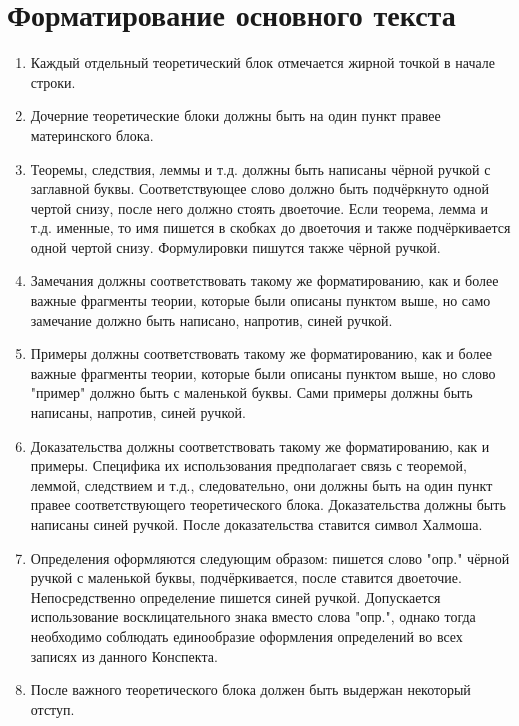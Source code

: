 \documentclass[a4paper]{article}
\theoremstyle{plain}
\theoremstyle{definition}
\theoremstyle{remark}
\begin{document}
    \section{Форматирование основного текста}
    \begin{enumerate}
        \item Каждый отдельный теоретический блок отмечается жирной точкой в начале строки.
        \item Дочерние теоретические блоки должны быть на один пункт правее материнского блока.
        \item Теоремы, следствия, леммы и т.д. должны быть написаны чёрной ручкой с заглавной буквы. Соответствующее слово должно быть подчёркнуто одной чертой снизу, после него должно стоять двоеточие. Если теорема, лемма и т.д. именные, то имя пишется в скобках до двоеточия и также подчёркивается одной чертой снизу. Формулировки пишутся также чёрной ручкой.
        \item Замечания должны соответствовать такому же форматированию, как и более важные фрагменты теории, которые были описаны пунктом выше, но само замечание должно быть написано, напротив, синей ручкой.
        \item Примеры должны соответствовать такому же форматированию, как и более важные фрагменты теории, которые были описаны пунктом выше, но слово "пример" должно быть с маленькой буквы. Сами примеры должны быть написаны, напротив, синей ручкой.
        \item Доказательства должны соответствовать такому же форматированию, как и примеры. Специфика их использования предполагает связь с теоремой, леммой, следствием и т.д., следовательно, они должны быть на один пункт правее соответствующего теоретического блока. Доказательства должны быть написаны синей ручкой. После доказательства ставится символ Халмоша.
        \item Определения оформляются следующим образом: пишется слово "опр." чёрной ручкой с маленькой буквы, подчёркивается, после ставится двоеточие. Непосредственно определение пишется синей ручкой. Допускается использование восклицательного знака вместо слова "опр.", однако тогда необходимо соблюдать единообразие оформления определений во всех записях из данного Конспекта.
        \item После важного теоретического блока должен быть выдержан некоторый отступ.
    \end{enumerate}
\end{document}
